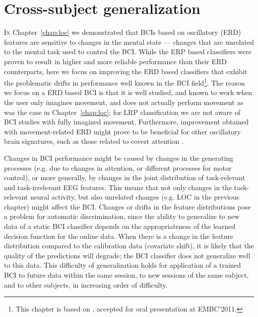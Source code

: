 \chapter{Cross-subject generalization}
\label{chap:sob}

\lettrine{I}{n} Chapter~\ref{chap:loc} we demonstrated that \acp{BCI} based on
oscillatory (\ac{ERD}) features are sensitive to changes in the mental
state --- changes that are unrelated to the mental task used to control the
\ac{BCI}. While the \ac{ERP} based classifiers were proven to result in higher
and more reliable performance than their \ac{ERD} counterparts, here we focus
on improving the \ac{ERD} based classifiers that exhibit the problematic drifts
in performance well known in the \ac{BCI} field\footnote{This chapter is based
on \cite{reuderink2011sib}, accepted for oral presentation at EMBC'2011.}. The
reason we focus on a \ac{ERD} based \ac{BCI} is that it is well studied, and
known to work when the user only imagines movement, and does not actually
perform movement as was the case in Chapter~\ref{chap:loc}; for \ac{LRP}
classification we are not aware of \ac{BCI} studies with fully imagined
movement. Furthermore, improvement obtained with movement-related \ac{ERD}
might prove to be beneficial for other oscillatory brain signatures, such as
those related to covert attention \citep[e.g.][]{vangerven2009amp}.

Changes in \ac{BCI} performance might be caused by changes
in the generating processes (e.g. due to changes in attention, or different
processes for motor control), or more generally, by changes in the joint
distribution of task-relevant and task-irrelevant \ac{EEG} features. This means
that not only changes in the task-relevant neural activity, but also unrelated
changes (e.g. \ac{LOC} in the previous chapter) might affect the \ac{BCI}.
Changes or drifts in the feature distributions pose a problem for automatic
discrimination, since the ability to generalize to new data of a static
\ac{BCI} classifier depends on the appropriateness of the learned decision
function for the online data. When there is a change in the feature
distribution compared to the calibration data (covariate shift), it is likely
that the quality of the predictions will degrade; the \ac{BCI} classifier does not
generalize well to this data.
% 
This difficulty of generalization holds for application of a trained
\ac{BCI} to future data within the same session, to new sessions of the same
subject, and to other subjects, in increasing order of difficulty.

